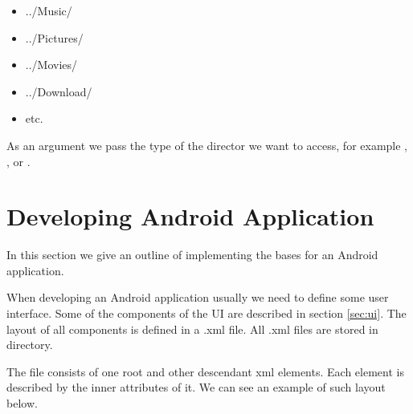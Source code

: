\begin{itemize}
\item{../Music/}
\item{../Pictures/}
\item{../Movies/}
\item{../Download/}
\item{etc.}
\end{itemize}

As an argument we pass the type of the director we want to access, for example , , or . %


\section{Developing Android Application}

In this section we give an outline of implementing the bases for an Android application.

When developing an Android application usually we need to define some user interface.
Some of the components of the UI are described in section \ref{sec:ui}.
The layout of all components is defined in a .xml file.
All .xml files are stored in  directory.

The file consists of one root and other descendant xml elements.
Each element is described by the inner attributes of it.
We can see an example of such layout below.
  

